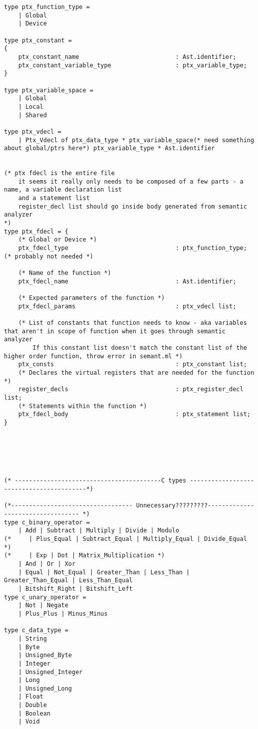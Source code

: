 \begin{verbatim}
type ptx_function_type = 
	| Global 
	| Device 

type ptx_constant = 
{
	ptx_constant_name 							: Ast.identifier;
	ptx_constant_variable_type					: ptx_variable_type;
}

type ptx_variable_space = 
	| Global 
	| Local 
	| Shared

type ptx_vdecl = 
    | Ptx_Vdecl of ptx_data_type * ptx_variable_space(* need something about global/ptrs here*) ptx_variable_type * Ast.identifier


(* ptx fdecl is the entire file
	it seems it really only needs to be composed of a few parts - a name, a variable declaration list
	and a statement list
	register_decl list should go inside body generated from semantic analyzer
*)
type ptx_fdecl = {
	(* Global or Device *)
	ptx_fdecl_type 								: ptx_function_type; (* probably not needed *)

	(* Name of the function *)
	ptx_fdecl_name 								: Ast.identifier;

	(* Expected parameters of the function *)
	ptx_fdecl_params 							: ptx_vdecl list;

	(* List of constants that function needs to know - aka variables that aren't in scope of function when it goes through semantic analyzer 
		If this constant list doesn't match the constant list of the higher order function, throw error in semant.ml *)
	ptx_consts 									: ptx_constant list; 
	(* Declares the virtual registers that are needed for the function *)
	register_decls 								: ptx_register_decl list;
	(* Statements within the function *)
	ptx_fdecl_body 								: ptx_statement list;
}






(* -----------------------------------------C types -----------------------------------------*)

(*---------------------------------- Unnecessary?????????---------------------------------- *)
type c_binary_operator =
    | Add | Subtract | Multiply | Divide | Modulo
(*     | Plus_Equal | Subtract_Equal | Multiply_Equal | Divide_Equal  *)
(*     | Exp | Dot | Matrix_Multiplication *)
    | And | Or | Xor
    | Equal | Not_Equal | Greater_Than | Less_Than | Greater_Than_Equal | Less_Than_Equal
    | Bitshift_Right | Bitshift_Left 
type c_unary_operator = 
    | Not | Negate
    | Plus_Plus | Minus_Minus

type c_data_type = 
	| String
    | Byte
    | Unsigned_Byte
    | Integer
    | Unsigned_Integer
    | Long
    | Unsigned_Long
    | Float
    | Double
    | Boolean
    | Void


\end{verbatim}
